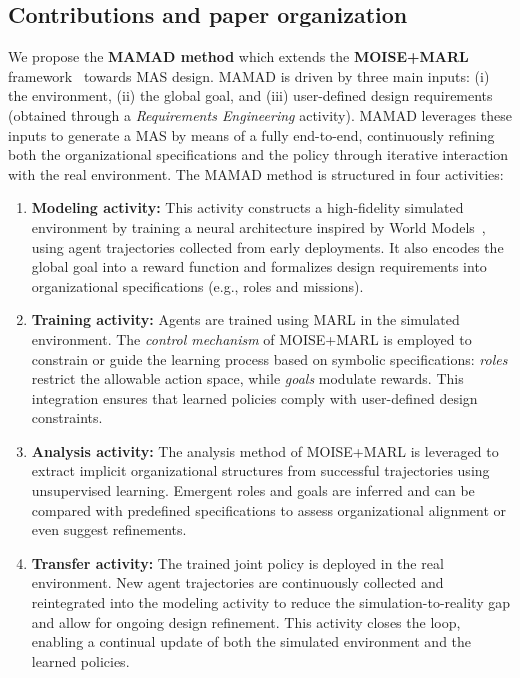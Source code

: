 \documentclass[pdflatex,sn-mathphys-num]{sn-jnl}%
\theoremstyle{thmstyleone}%
\theoremstyle{thmstyletwo}%
\theoremstyle{thmstylethree}%
\begin{document}
\subsection{Contributions and paper organization}

We propose the \textbf{MAMAD method} which extends the \textbf{MOISE+MARL} framework~\cite{soule2025moisemarl} towards MAS design. MAMAD is driven by three main inputs: (i) the environment, (ii) the global goal, and (iii) user-defined design requirements (obtained through a \textit{Requirements Engineering} activity). MAMAD leverages these inputs to generate a MAS by means of a fully end-to-end, continuously refining both the organizational specifications and the policy through iterative interaction with the real environment.
The MAMAD method is structured in four activities:

\begin{enumerate}
    \item \textbf{Modeling activity:} This activity constructs a high-fidelity simulated environment by training a neural architecture inspired by World Models~\cite{Ha2018}, using agent trajectories collected from early deployments. It also encodes the global goal into a reward function and formalizes design requirements into organizational specifications (e.g., roles and missions).
          
    \item \textbf{Training activity:} Agents are trained using MARL in the simulated environment. The \textit{control mechanism} of MOISE+MARL is employed to constrain or guide the learning process based on symbolic specifications: \textit{roles} restrict the allowable action space, while \textit{goals} modulate rewards. This integration ensures that learned policies comply with user-defined design constraints.
          
    \item \textbf{Analysis activity:} The analysis method of MOISE+MARL is leveraged to extract implicit organizational structures from successful trajectories using unsupervised learning. Emergent roles and goals are inferred and can be compared with predefined specifications to assess organizational alignment or even suggest refinements.
          
    \item \textbf{Transfer activity:} The trained joint policy is deployed in the real environment. New agent trajectories are continuously collected and reintegrated into the modeling activity to reduce the simulation-to-reality gap and allow for ongoing design refinement. This activity closes the loop, enabling a continual update of both the simulated environment and the learned policies.
\end{enumerate}
\end{document}
